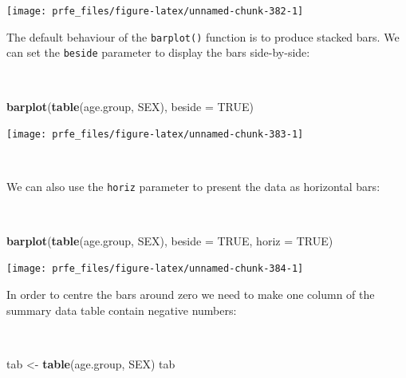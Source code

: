 \documentclass[12pt,a4paper]{book}
\newenvironment{Shaded}{\begin{snugshade}}{\end{snugshade}}
\newcommand{\KeywordTok}[1]{\textcolor[rgb]{0.13,0.29,0.53}{\textbf{#1}}}
\newcommand{\DataTypeTok}[1]{\textcolor[rgb]{0.13,0.29,0.53}{#1}}
\newcommand{\StringTok}[1]{\textcolor[rgb]{0.31,0.60,0.02}{#1}}
\newcommand{\OtherTok}[1]{\textcolor[rgb]{0.56,0.35,0.01}{#1}}
\newcommand{\NormalTok}[1]{#1}
\theoremstyle{definition}
\theoremstyle{definition}
\theoremstyle{definition}
\theoremstyle{remark}
\begin{document}
\begin{center}\texttt{[image: prfe\_files/figure-latex/unnamed-chunk-382-1]} \end{center}

\newpage

The default behaviour of the \texttt{barplot()} function is to produce
stacked bars. We can set the \texttt{beside} parameter to display the
bars side-by-side:

~

\begin{Shaded}
\begin{Highlighting}[]
\KeywordTok{barplot}\NormalTok{(}\KeywordTok{table}\NormalTok{(age.group, SEX), }\DataTypeTok{beside =} \OtherTok{TRUE}\NormalTok{)}
\end{Highlighting}
\end{Shaded}

\begin{center}\texttt{[image: prfe\_files/figure-latex/unnamed-chunk-383-1]} \end{center}

~

We can also use the \texttt{horiz} parameter to present the data as
horizontal bars:

~

\begin{Shaded}
\begin{Highlighting}[]
\KeywordTok{barplot}\NormalTok{(}\KeywordTok{table}\NormalTok{(age.group, SEX), }\DataTypeTok{beside =} \OtherTok{TRUE}\NormalTok{, }\DataTypeTok{horiz =} \OtherTok{TRUE}\NormalTok{)}
\end{Highlighting}
\end{Shaded}

\begin{center}\texttt{[image: prfe\_files/figure-latex/unnamed-chunk-384-1]} \end{center}

\newpage

In order to centre the bars around zero we need to make one column of
the summary data table contain negative numbers:

~

\begin{Shaded}
\begin{Highlighting}[]
\NormalTok{tab <-}\StringTok{ }\KeywordTok{table}\NormalTok{(age.group, SEX)}
\NormalTok{tab}
\end{Highlighting}
\end{Shaded}
\end{document}
